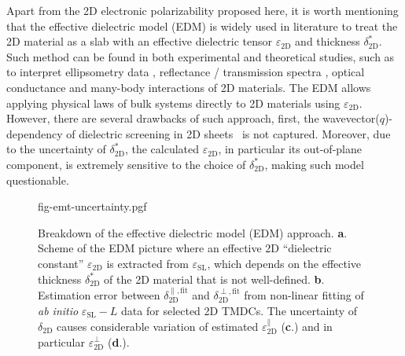 Apart from the 2D electronic polarizability proposed here, it is worth
mentioning that the effective dielectric model (EDM) is widely used in
literature to treat the 2D material as a slab with an effective
dielectric tensor $\varepsilon_{\mathrm{2D}}$ and thickness
$\delta^{*}_{\mathrm{2D}}$. Such method can be found in both
experimental and theoretical studies, such as to interpret
ellipsometry data
\autocite{graphene-epsilon10,Duesberg_2014_opt_MoS2,Chiang13,},
reflectance / transmission spectra
\autocite{Li_2014_opt_ml_mos2,Yoffe-Wilson_1969_TMDC}, optical conductance
\autocite{Matthes_2016_effective_PRB} and many-body interactions
\autocite{Sohier_2016_2D_eps,Markel_2016_EMT} of 2D materials. The EDM
allows applying physical laws of bulk systems directly to 2D materials
using $\varepsilon_{\mathrm{2D}}$. However, there are several
drawbacks of such approach, first, the
wavevector($q$)-dependency of dielectric screening in 2D
sheets~\autocite{Cudazzo_2011_screening_2D,Olsen_2016_hydrogen,Trolle_2017_eps_subst}
is not captured. Moreover, due to the
uncertainty of $\delta^{*}_{\mathrm{2D}}$, the calculated
$\varepsilon_{\mathrm{2D}}$, in particular its out-of-plane component,
is extremely sensitive to the choice of $\delta^{*}_{\mathrm{2D}}$,
making such model questionable.


\begin{figure}[!htbp]
  \centering
  {fig-emt-uncertainty.pgf}
  \caption{\label{fig-emt} %
    Breakdown of the effective dielectric model (EDM)
    approach. \textbf{a}.  Scheme of the EDM picture where an
    effective 2D ``dielectric constant'' $\varepsilon_{\mathrm{2D}}$
    is extracted from $\varepsilon_{\mathrm{SL}}$, which depends on
    the effective thickness $\delta_{\mathrm{2D}}^{*}$ of the 2D
    material that is not well-defined. \textbf{b}.  Estimation error
    between $\delta_{\mathrm{2D}}^{\parallel, \text{fit}}$ and
    $\delta_{\mathrm{2D}}^{\perp, \text{fit}}$ from non-linear fitting
    of \textit{ab initio} $\varepsilon_{\mathrm{SL}} - L$ data for
    selected 2D TMDCs. The uncertainty of $\delta_{\mathrm{2D}}$
    causes considerable variation of estimated
    $\varepsilon_{\mathrm{2D}}^{\parallel}$ (\textbf{c}.) and in
    particular $\varepsilon_{\mathrm{2D}}^{\perp}$ (\textbf{d}.).  }
\end{figure}

